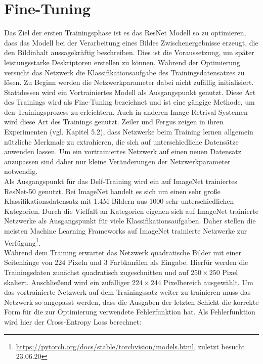 \section{Fine-Tuning}

Das Ziel der ersten Trainingsphase ist es das ResNet Modell so zu optimieren, dass das Modell bei der Verarbeitung eines Bildes Zwischenergebnisse erzeugt, die den Bildinhalt aussagekräftig beschreiben. Dies ist die Voraussetzung, um später leistungsstarke Deskriptoren erstellen zu können. Während der Optimierung versucht das Netzwerk die Klassifikationsaufgabe des Trainingsdatensatzes zu lösen. Zu Beginn werden die Netzwerkparameter dabei nicht zufällig initialisiert. Stattdessen wird ein Vortrainiertes Modell als Ausgangspunkt genutzt. Diese Art des Trainings wird als Fine-Tuning bezeichnet und ist eine gängige Methode, um den Trainingsprozess zu erleichtern. Auch in anderen Image Retrival Systemen \cite{convnet} \cite{siamac_contrastive_loss} wird diese Art des Trainings genutzt. Zeiler und Fergus zeigen in ihren Experimenten (vgl. \cite{extraction_point_meaning} Kapitel 5.2), dass Netzwerke beim Training lernen allgemein nützliche Merkmale zu extrahieren, die sich auf unterschiedliche Datensätze anwenden lassen. Um ein vortrainiertes Netzwerk auf einen neuen Datensatz anzupassen sind daher nur kleine Veränderungen der Netzwerkparameter notwendig.
\\
Als Ausgangspunkt für das Delf-Training wird ein auf ImageNet trainiertes ResNet-50 genutzt. Bei ImageNet handelt es sich um einen sehr große Klassifikationsdatensatz mit 1.4M Bildern aus 1000 sehr unterschiedlichen Kategorien. Durch die Vielfalt an Kategorien eigenen sich auf ImageNet trainierte Netzwerke als Ausgangspunkt für viele Klassifikationsaufgaben. Daher stellen die meisten Machine Learning Frameworks auf ImageNet trainierte Netzwerke zur Verfügung\footnote[2]{\url{https://pytorch.org/docs/stable/torchvision/models.html}, zuletzt besucht 23.06.20}. 
\\
Während dem Training erwartet das Netzwerk quadratische Bilder mit einer Seitenlänge von 224 Pixeln und 3 Farbkanälen als Eingabe. Hierfür werden die Trainingsdaten zunächst quadratisch zugeschnitten und auf $250\times250$ Pixel skaliert. Anschließend wird ein zufälliger $224\times244$ Pixelbereich ausgewählt.
Um das vortrainierte Netzwerk auf dem Trainingssatz weiter zu trainieren muss das Netzwerk so angepasst werden, dass die Ausgaben der letzten Schicht die korrekte Form für die zur Optimierung verwendete Fehlerfunktion hat. Als Fehlerfunktion wird hier der Cross-Entropy Loss berechnet:
